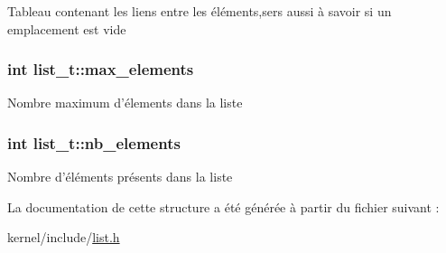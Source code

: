 Tableau contenant les liens entre les éléments,sers aussi à savoir si un emplacement est vide \hypertarget{structlist__t_a646f05091de2a2667b0f3c9aaffdfbdc}{
\subsubsection[{max\+\_\+elements}]{\setlength{\rightskip}{0pt plus 5cm}int list\+\_\+t\+::max\+\_\+elements}}\label{structlist__t_a646f05091de2a2667b0f3c9aaffdfbdc}
Nombre maximum d'élements dans la liste \hypertarget{structlist__t_a21f815dfb80c00df4cc95304bc29161f}{
\subsubsection[{nb\+\_\+elements}]{\setlength{\rightskip}{0pt plus 5cm}int list\+\_\+t\+::nb\+\_\+elements}}\label{structlist__t_a21f815dfb80c00df4cc95304bc29161f}
Nombre d'éléments présents dans la liste 

La documentation de cette structure a été générée à partir du fichier suivant \+:\begin{DoxyCompactItemize}
\item 
kernel/include/\hyperlink{list_8h}{list.\+h}\end{DoxyCompactItemize}
